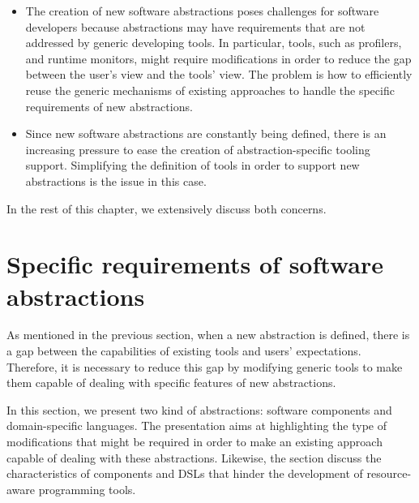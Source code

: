 \begin{itemize}
\item The creation of new software abstractions poses challenges for software developers because abstractions may have requirements that are not addressed by generic developing tools.
In particular, tools, such as profilers, and runtime monitors, might require modifications in order to reduce the gap between the user's view and the tools' view.
The problem is how to efficiently reuse the generic mechanisms of existing approaches to handle the specific requirements of new abstractions.

\item Since new software abstractions are constantly being defined, there is an increasing pressure to ease the creation of abstraction-specific tooling support.
Simplifying the definition of tools in order to support new abstractions is the issue in this case. 
\end{itemize}

In the rest of this chapter, we extensively discuss both concerns.

\section{Specific requirements of software abstractions}
As mentioned in the previous section, when a new abstraction is defined, there is a gap between the capabilities of existing tools and users' expectations.
Therefore, it is necessary to reduce this gap by modifying generic tools to make them capable of dealing with specific features of new abstractions.

In this section, we present two kind of abstractions: software components and domain-specific languages.
The presentation aims at highlighting the type of modifications that might be required in order to make an existing approach capable of dealing with these abstractions.
Likewise, the section discuss the characteristics of components and DSLs that hinder the development of resource-aware programming tools.

